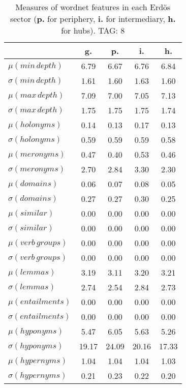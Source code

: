 \begin{table}[h!]
\begin{center}
\begin{tabular}{| l | c | c | c | c |}\hline
 & g. & p. & i. & h. \\\hline
$\mu(min\,depth)$ & 6.79  & 6.67  & 6.76  & 6.84 \\\hline
$\sigma(min\,depth)$ & 1.61  & 1.60  & 1.63  & 1.60 \\\hline
$\mu(max\,depth)$ & 7.09  & 7.00  & 7.05  & 7.13 \\\hline
$\sigma(max\,depth)$ & 1.75  & 1.75  & 1.75  & 1.74 \\\hline
$\mu(holonyms)$ & 0.14  & 0.13  & 0.17  & 0.13 \\\hline
$\sigma(holonyms)$ & 0.59  & 0.59  & 0.59  & 0.58 \\\hline
$\mu(meronyms)$ & 0.47  & 0.40  & 0.53  & 0.46 \\\hline
$\sigma(meronyms)$ & 2.70  & 2.84  & 3.30  & 2.30 \\\hline
$\mu(domains)$ & 0.06  & 0.07  & 0.08  & 0.05 \\\hline
$\sigma(domains)$ & 0.27  & 0.27  & 0.30  & 0.25 \\\hline
$\mu(similar)$ & 0.00  & 0.00  & 0.00  & 0.00 \\\hline
$\sigma(similar)$ & 0.00  & 0.00  & 0.00  & 0.00 \\\hline
$\mu(verb\,groups)$ & 0.00  & 0.00  & 0.00  & 0.00 \\\hline
$\sigma(verb\,groups)$ & 0.00  & 0.00  & 0.00  & 0.00 \\\hline
$\mu(lemmas)$ & 3.19  & 3.11  & 3.20  & 3.21 \\\hline
$\sigma(lemmas)$ & 2.74  & 2.54  & 2.84  & 2.73 \\\hline
$\mu(entailments)$ & 0.00  & 0.00  & 0.00  & 0.00 \\\hline
$\sigma(entailments)$ & 0.00  & 0.00  & 0.00  & 0.00 \\\hline
$\mu(hyponyms)$ & 5.47  & 6.05  & 5.63  & 5.26 \\\hline
$\sigma(hyponyms)$ & 19.17  & 24.09  & 20.16  & 17.33 \\\hline
$\mu(hypernyms)$ & 1.04  & 1.04  & 1.04  & 1.03 \\\hline
$\sigma(hypernyms)$ & 0.21  & 0.23  & 0.22  & 0.20 \\\hline
\end{tabular}
\caption{Measures of wordnet features in each Erd\"os sector ({{\bf p.}} for periphery, {{\bf i.}} for intermediary, {{\bf h.}} for hubs). TAG: 8}
\end{center}
\end{table}